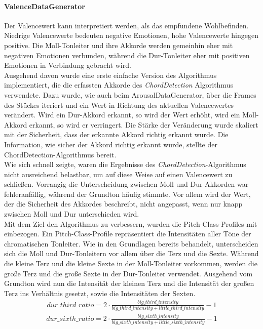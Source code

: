 \documentclass[11pt,a4paper]{article}
\begin{document}
\paragraph{ValenceDataGenerator}
Der Valencewert kann interpretiert werden, als das empfundene Wohlbefinden. Niedrige Valencewerte bedeuten negative Emotionen, hohe Valencewerte hingegen positive. Die Moll-Tonleiter und ihre Akkorde werden gemeinhin eher mit negativen Emotionen verbunden, während die Dur-Tonleiter eher mit positiven Emotionen in Verbindung gebracht wird.\\
Ausgehend davon wurde eine erste einfache Version des Algorithmus implementiert, die die erfassten Akkorde des \textit{ChordDetection} Algorithmus verwendete. Dazu wurde, wie auch beim ArousalDataGenerator, über die Frames des Stückes iteriert und ein Wert in Richtung des aktuellen Valencewertes verändert. Wird ein Dur-Akkord erkannt, so wird der Wert erhöht, wird ein Moll-Akkord erkannt, so wird er verringert. Die Stärke der Veränderung wurde skaliert mit der Sicherheit, dass der erkannte Akkord richtig erkannt wurde. Die Information, wie sicher der Akkord richtig erkannt wurde, stellte der ChordDetection-Algorithmus bereit.\\
Wie sich schnell zeigte, waren die Ergebnisse des \textit{ChordDetection}-Algorithmus nicht ausreichend belastbar, um auf diese Weise auf einen Valencewert zu schließen. Vorrangig die Unterscheidung zwischen Moll und Dur Akkorden war fehleranfällig, während der Grundton häufig stimmte. Vor allem wird der Wert, der die Sicherheit des Akkordes beschreibt, nicht angepasst, wenn nur knapp zwischen Moll und Dur unterschieden wird.\\
Mit dem Ziel den Algorithmus zu verbessern, wurden die Pitch-Class-Profiles mit einbezogen. Ein Pitch-Class-Profile repräsentiert die Intensitäten aller Töne der chromatischen Tonleiter. Wie in den Grundlagen bereits behandelt, unterscheiden sich die Moll und Dur-Tonleitern vor allem über die Terz und die Sexte. Während die kleine Terz und die kleine Sexte in der Moll-Tonleiter vorkommen, werden die große Terz und die große Sexte in der Dur-Tonleiter verwendet. Ausgehend vom Grundton wird nun die Intensität der kleinen Terz und die Intensität der großen Terz ins Verhältnis gesetzt, sowie die Intensitäten der Sexten.
\begin{align}
dur\_third\_ratio = 2 \cdot \frac{big\_third\_intensity}{big\_third\_intensity + little\_third\_intensity} - 1
\end{align}
\begin{align}
dur\_sixth\_ratio = 2 \cdot \frac{big\_sixth\_intensity}{big\_sixth\_intensity + little\_sixth\_intensity}- 1
\end{align}
\end{document}
